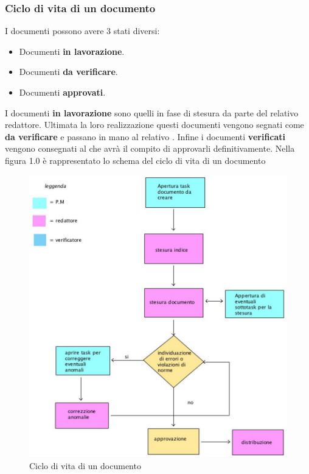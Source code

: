 \subsubsection{Ciclo di vita di un documento}
 I documenti possono avere 3 stati diversi:
\begin{itemize}
  \item Documenti \textbf{in lavorazione}.
  \item Documenti \textbf{da verificare}.
  \item Documenti \textbf{approvati}.
\end{itemize}
I documenti \textbf{in lavorazione} sono quelli in fase di stesura da parte del relativo redattore. Ultimata la loro realizzazione questi documenti vengono segnati come \textbf{da verificare} e passano in mano al relativo \Ver. Infine i documenti \textbf{verificati} vengono consegnati al \Pm che avrà il compito di approvarli definitivamente. Nella figura 1.0 è rappresentato lo schema del ciclo di vita di un documento
\label{figura 1.0}
\begin{figure}[ht]
	\centering
	\includegraphics[scale=0.8]{ciclo_di_vita.jpg}
	\caption{Ciclo di vita di un documento}
\end{figure}

